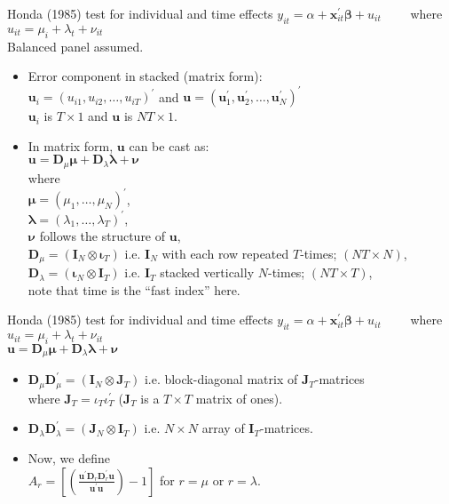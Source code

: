 \documentclass{beamer}
\begin{document}
\begin{frame}{Honda (1985) test for individual and time effects}
\small
$y_{it} = \alpha + \bm{x}^{\prime}_{it} \bm{\beta} + u_{it} \qquad$    where $u_{it}=\mu_i + \lambda_t + \nu_{it}$\\ \smallskip Balanced panel assumed. \bigskip
\begin{itemize}
    \item Error component in stacked (matrix form): \\ \smallskip
    $\bm{u}_i = \left( u_{i1}, u_{i2}, \dots, u_{iT} \right)^{\prime}$ and $\bm{u} = \left( \bm{u}_1^{\prime}, \bm{u}_2^{\prime}, \dots, \bm{u}_N^{\prime} \right)^{\prime}$ \\ \smallskip
    $\bm{u}_i$ is $T \times 1$ and $\bm{u}$ is $NT \times 1$.
    \medskip
    \item In matrix form, $\bm{u}$ can be cast as: \\
    $\bm{u} = \bm{D}_{\mu} \bm{\mu} + \bm{D}_{\lambda} \bm{\lambda} + \bm{\nu}$ \\ \smallskip
    where \\$\bm{\mu} = (\mu_1, \dots, \mu_N)^{\prime}$, \\$\bm{\lambda} = (\lambda_1, \dots, \lambda_T)^{\prime}$, \\$\bm{\nu}$ follows the structure of $\bm{u}$,\\
    $\bm{D}_{\mu} = (\bm{I}_N \otimes \bm{\iota}_T)$ i.e. $\bm{I}_N$ with each row repeated $T$-times; $(NT \times N)$, \\
    $\bm{D}_{\lambda} = ( \bm{\iota}_N \otimes \bm{I}_T )$ i.e. $\bm{I}_T$ stacked vertically $N$-times; $(NT \times T)$, \\ 
    note that time is the ``fast index'' here.
    \end{itemize}
\end{frame}
\begin{frame}{Honda (1985) test for individual and time effects}
$y_{it} = \alpha + \bm{x}^{\prime}_{it} \bm{\beta} + u_{it} \qquad$    where $u_{it}=\mu_i + \lambda_t + \nu_{it}$\\ \medskip
$\bm{u} = \bm{D}_{\mu} \bm{\mu} + \bm{D}_{\lambda} \bm{\lambda} + \bm{\nu}$ \\ \bigskip
\begin{itemize}
    \item $\bm{D}_{\mu} \bm{D}_{\mu}^{\prime} = \left(\bm{I}_N \otimes \bm{J}_T \right)$ i.e. block-diagonal matrix of $\bm{J}_T$-matrices \\where $\bm{J}_T=\iota_T \iota_T^{\prime}$  ($\bm{J}_T$ is a $T \times T$ matrix of ones).
    \medskip
    \item $\bm{D}_{\lambda} \bm{D}_{\lambda}^{\prime} = \left(\bm{J}_N \otimes \bm{I}_T   \right)$ i.e. $N\times N$ array of $\bm{I}_T$-matrices.
    \medskip
    \item Now, we define\\ \medskip
    $A_r = \left[ \left( \frac{\bm{u}^{\prime}\bm{D}_r \bm{D}_r^{\prime} \bm{u}}{\bm{u}^{\prime}\bm{u}} \right) - 1 \right]$ for $r=\mu$ or $r=\lambda$.
    \end{itemize}
\end{frame}
\end{document}
